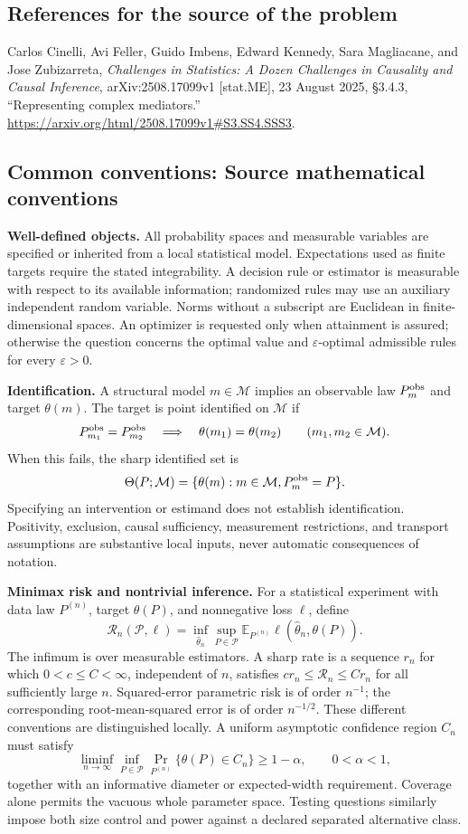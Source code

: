 \documentclass[11pt,a4paper]{article}
\newcommand{\E}{\mathbb E}
\begin{document}
\subsection*{References for the source of the problem}
Carlos Cinelli, Avi Feller, Guido Imbens, Edward Kennedy, Sara Magliacane, and Jose Zubizarreta, \emph{Challenges in Statistics: A Dozen Challenges in Causality and Causal Inference}, arXiv:2508.17099v1 [stat.ME], 23 August 2025, \S3.4.3, ``Representing complex mediators.'' \url{https://arxiv.org/html/2508.17099v1#S3.SS4.SSS3}.

\subsection*{Common conventions: Source mathematical conventions}

\textbf{Well-defined objects.}
All probability spaces and measurable variables are specified or inherited
from a local statistical model. Expectations used as finite targets require
the stated integrability. A decision rule or estimator is measurable with
respect to its available information; randomized rules may use an auxiliary
independent random variable. Norms without a subscript are Euclidean in
finite-dimensional spaces. An optimizer is requested only when attainment
is assured; otherwise the question concerns the optimal value and
$\varepsilon$-optimal admissible rules for every $\varepsilon>0$.

\textbf{Identification.}
A structural model $m\in\mathcal M$ implies an observable law
$P_m^{\rm obs}$ and target $\theta(m)$. The target is point identified on
$\mathcal M$ if
\[
 P_{m_1}^{\rm obs}=P_{m_2}^{\rm obs}
 \quad\Longrightarrow\quad\theta(m_1)=\theta(m_2)
 \qquad(m_1,m_2\in\mathcal M).
\]
When this fails, the sharp identified set is
\[
 \Theta(P;\mathcal M)=\{\theta(m):m\in\mathcal M,
                                  P_m^{\rm obs}=P\}.
\]
Specifying an intervention or estimand does not establish identification.
Positivity, exclusion, causal sufficiency, measurement restrictions, and
transport assumptions are substantive local inputs, never automatic
consequences of notation.

\textbf{Minimax risk and nontrivial inference.}
For a statistical experiment with data law $P^{(n)}$, target $\theta(P)$,
and nonnegative loss $\ell$, define
\[
 \mathcal R_n(\mathcal P,\ell)
   =\inf_{\widehat\theta_n}\sup_{P\in\mathcal P}
      \E_{P^{(n)}}\ell(\widehat\theta_n,\theta(P)).
\]
The infimum is over measurable estimators. A sharp rate is a sequence
$r_n$ for which $0<c\leq C<\infty$, independent of $n$, satisfies
$c r_n\leq\mathcal R_n\leq C r_n$ for all sufficiently large $n$.
Squared-error parametric risk is of order $n^{-1}$; the corresponding
root-mean-squared error is of order $n^{-1/2}$. These different conventions
are distinguished locally. A uniform asymptotic confidence region $C_n$
must satisfy
\[
 \liminf_{n\to\infty}\inf_{P\in\mathcal P}
     \Pr_{P^{(n)}}\{\theta(P)\in C_n\}\geq 1-\alpha,
 \qquad 0<\alpha<1,
\]
together with an informative diameter or expected-width requirement.
Coverage alone permits the vacuous whole parameter space. Testing questions
similarly impose both size control and power against a declared separated
alternative class.
\end{document}
